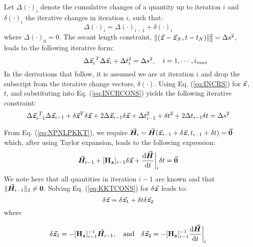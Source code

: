Let $\Delta (\cdot)_i$ denote the cumulative changes of a quantity up to
iteration $i$ and $\delta (\cdot)_i$ the iterative changes in iteration $i$,
such that:
\begin{equation}
	\Delta (\cdot)_i=\Delta (\cdot)_{i-1}+\delta (\cdot)_i
	\label{eq:INCRS}
\end{equation}
\noindent where $\Delta (\cdot)_0 = 0$.
The secant length constraint, $\Vert
(\vec{\boldsymbol{z}}-\vec{\boldsymbol{z}}_N,t-t_N)\Vert_2^2=\Delta s^2$, leads to the following
iterative form:
\begin{equation}
	\hspace{1.8cm}\Delta \vec{\boldsymbol{z}}_i^{\ T}\Delta \vec{\boldsymbol{z}}_i + \Delta 
	t^2_i=\Delta 
	s^2,\quad
	i=1,\cdots, i_{max}
	\label{eq:INCRCONS}
\end{equation}
In the derivations that follow, it is assumed we are at iteration $i$ and drop
the subscript from the iterative change vectors, $\delta(\cdot)$. Using Eq. 
(\ref{eq:INCRS}) for
$\vec{\boldsymbol{z}}$, $t$, and substituting into Eq. (\ref{eq:INCRCONS}) yields the
following iterative constraint:
\begin{equation}
	\Delta\bvec{z}_{i-1}^{\ T}\Delta\bvec{z}_{i-1}+\delta
	\bvec{z}^T\delta\bvec{z}+2\Delta\bvec{z}_{i-1}\delta\bvec{z}+\Delta 
	t^2_{i-1}+\delta t^2+2\Delta t_{i-1}\delta t=\Delta
	s^2
	\label{eq:ITERCONS}
\end{equation}

From Eq. (\ref{eq:NPNLPKKT}), we require
$\vec{\boldsymbol{H}}_i=\vec{\boldsymbol{H}}(\vec{\boldsymbol{z}}_{i-1}+\delta\vec{\boldsymbol{z}},t_{i-1}+\delta t)=\vec{\boldsymbol{0}}$
which, after using Taylor expansion, leads to the following expression:
\begin{equation}
	\vec{\boldsymbol{H}}_{i-1}+[\mathbf{H}_{\bm{z}}]_{i-1}\delta\vec{\boldsymbol{z}}+
	\frac{\text{d}\vec{\boldsymbol{H}}}{\text{d}t}\bigg |_i \delta t=
	\vec{\boldsymbol{0}}
	\label{eq:KKTCONS}
\end{equation}
We note here that all quantities in iteration $i-1$ are known and that
$\Vert \vec{\boldsymbol{H}}_{i-1}\Vert_2 \neq \bm{0}$. Solving Eq. (\ref{eq:KKTCONS}) for
$\delta\vec{\boldsymbol{z}}$ leads to:
\begin{equation}
	\delta\vec{\boldsymbol{z}}=\delta\vec{\boldsymbol{z}}_1+\delta t\delta\vec{\boldsymbol{z}}_2
	\label{eq:DELZ}
\end{equation}
\noindent where 

\begin{equation}
	\delta\vec{\boldsymbol{z}}_1 
	=-[\mathbf{H}_{\bm{z}}]_{i-1}^{-1}\vec{\boldsymbol{H}}_{i-1},\quad \text{and}\quad 
	\delta\vec{\boldsymbol{z}}_2=-[\mathbf{H}_{\bm{z}}]_{i-1}^{-1}\frac{\text{d}\vec{\boldsymbol{H}}}{\text{d}t}\bigg
	|_i
	\label{eq:zetasss}
\end{equation}

